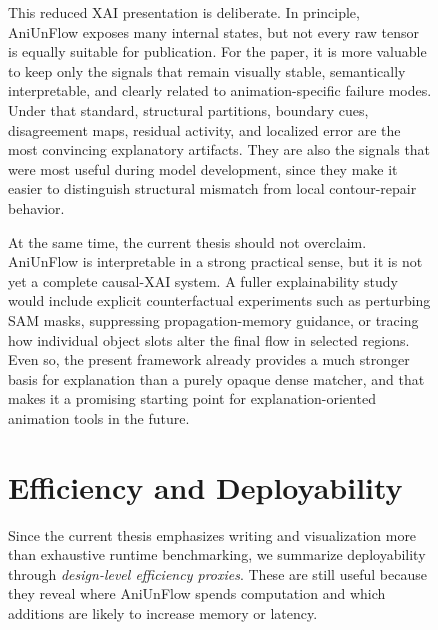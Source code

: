 \begin{figure}[t]
This reduced XAI presentation is deliberate. In principle, AniUnFlow exposes many internal states, but not every raw tensor is equally suitable for publication. For the paper, it is more valuable to keep only the signals that remain visually stable, semantically interpretable, and clearly related to animation-specific failure modes. Under that standard, structural partitions, boundary cues, disagreement maps, residual activity, and localized error are the most convincing explanatory artifacts. They are also the signals that were most useful during model development, since they make it easier to distinguish structural mismatch from local contour-repair behavior.

At the same time, the current thesis should not overclaim. AniUnFlow is interpretable in a strong practical sense, but it is not yet a complete causal-XAI system. A fuller explainability study would include explicit counterfactual experiments such as perturbing SAM masks, suppressing propagation-memory guidance, or tracing how individual object slots alter the final flow in selected regions. Even so, the present framework already provides a much stronger basis for explanation than a purely opaque dense matcher, and that makes it a promising starting point for explanation-oriented animation tools in the future.

\section{Efficiency and Deployability}

Since the current thesis emphasizes writing and visualization more than exhaustive runtime benchmarking, we summarize deployability through \emph{design-level efficiency proxies}. These are still useful because they reveal where AniUnFlow spends computation and which additions are likely to increase memory or latency.


\end{figure}

